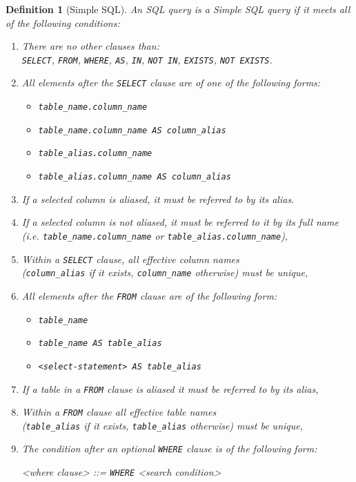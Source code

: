 \documentclass[magisterska,en]{pracamgr}
\newtheorem{defi}{Definition}[section]
\newcommand{\code}[1]{\texttt{#1}}
\begin{document}
\begin{defi}[Simple SQL]
An SQL query is a Simple SQL query if it meets all of the following conditions:
\begin{enumerate}
    \item There are no other clauses than:\\\code{SELECT}, \code{FROM}, \code{WHERE}, \code{AS}, \code{IN}, \code{NOT IN}, \code{EXISTS}, \code{NOT EXISTS}.
    \item All elements after the \code{SELECT} clause are of one of the following forms:
    \begin{itemize}
        \item \code{table_name.column_name}
        \item \code{table_name.column_name AS column_alias}
        \item \code{table_alias.column_name}
        \item \code{table_alias.column_name AS column_alias}
    \end{itemize}
    \item If a selected column is aliased, it must be referred to by its alias.
    \item If a selected column is not aliased, it must be referred to it by its full name\\(i.e. \code{table_name.column_name} or \code{table_alias.column_name}),
    \item Within a \code{SELECT} clause, all effective column names \\(\code{column_alias} if it exists, \code{column_name} otherwise) must be unique,
    \item All elements after the \code{FROM} clause are of the following form:
    \begin{itemize}
        \item \code{table_name}
        \item \code{table_name AS table_alias}
        \item \code{<select-statement> AS table_alias}
    \end{itemize}
    \item If a table in a \code{FROM} clause is aliased it must be referred to by its alias,
    \item Within a \code{FROM} clause all effective table names\\(\code{table_alias} if it exists, \code{table_alias} otherwise) must be unique,
    \item The condition after an optional \code{WHERE} clause is of the following form:
    \begin{grammar}
        <where clause> ::= \code{WHERE} <search condition>
        

\end{grammar}
\end{enumerate}
\end{defi}
\end{document}
